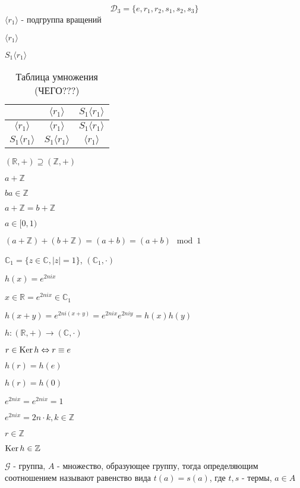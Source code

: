 \documentclass[../main/document.tex]{subfiles}
\begin{document}
\begin{exm}
$$\mathcal{D}_3=\{e,r_1,r_2,s_1,s_2,s_3\}$$
$\langle r_1\rangle$ - подгруппа вращений

$\langle r_1\rangle$

$S_1\langle r_1\rangle$

\begin{table}[h]
\centering
\caption*{Таблица умножения (ЧЕГО???)}
\renewcommand*{\arraystretch}{1.4}
\begin{tabular}{c|c|c}
  & $\langle r_1\rangle$ & $S_1\langle r_1\rangle$ \\ \hline
$\langle r_1\rangle$ & $\langle r_1\rangle$ & $S_1\langle r_1\rangle$ \\ \hline
$S_1\langle r_1\rangle$ & $S_1\langle r_1\rangle$ & $\langle r_1\rangle$  \\ 
\end{tabular}
\end{table}
\end{exm}

\begin{exm}
$(\mathbb{R},+)\supseteq (\mathbb{Z},+)$

$a+\mathbb{Z}$

$ba\in \mathbb{Z}$

$a+\mathbb{Z}=b+\mathbb{Z}$

$a\in [0,1)$

$(a+\mathbb{Z})+(b+\mathbb{Z})=(a+b)=(a+b)\mod 1$

$\mathbb{C}_1=\{z\in\mathbb{C},\vert z\vert=1\}$, $(\mathbb{C}_1,\cdot)$

$h(x)=e^{2nix}$

$x\in \mathbb{R}=e^{2nix}\in \mathbb{C}_1$

$h(x+y)=e^{2ni(x+y)}=e^{2nix}e^{2niy}=h(x)h(y)$

$h:(\mathbb{R},+)\rightarrow (\mathbb{C},\cdot)$

$r\in \operatorname{Ker} h \Leftrightarrow r\equiv e$

$h(r)=h(e)$

$h(r)=h(0)$

$e^{2nix}=e^{2nix}=1$

$e^{2nix}=2n\cdot k, k\in \mathbb{Z}$

$r\in \mathbb{Z}$

$\operatorname{Ker} h\in \mathbb{Z}$
\end{exm}

\begin{dfn}
$\mathcal{G}$ - группа, $A$ - множество, образующее группу, тогда определяющим соотношением называют равенство вида $t(a)=s(a)$, где $t,s$ - термы, $a\in A$
\end{dfn}
\end{document}
